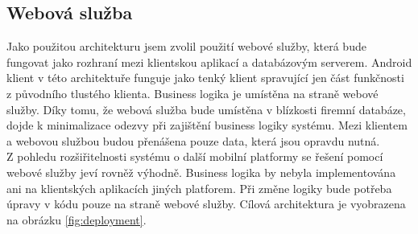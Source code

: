 \documentclass{diplomka}
\begin{document}
\subsection{Webová služba}
Jako použitou architekturu jsem zvolil použití webové služby, která bude fungovat jako rozhraní mezi klientskou aplikací a databázovým serverem. Android klient v této architektuře funguje jako tenký klient spravující jen část funkčnosti z původního tlustého klienta. Business logika je umístěna na straně webové služby. Díky tomu, že webová služba bude umístěna v blízkosti firemní databáze, dojde k minimalizace odezvy při zajištění business logiky systému. Mezi klientem a webovou službou budou přenášena pouze data, která jsou opravdu nutná. \\ \indent
Z pohledu rozšiřitelnosti systému o další mobilní platformy se řešení pomocí webové služby jeví rovněž výhodně. Business logika by nebyla implementována ani na klientských aplikacích jiných platforem. Při změne logiky bude potřeba úpravy v kódu pouze na straně webové služby. Cílová architektura je vyobrazena na obrázku \ref{fig:deployment}.

\newpage
\end{document}
